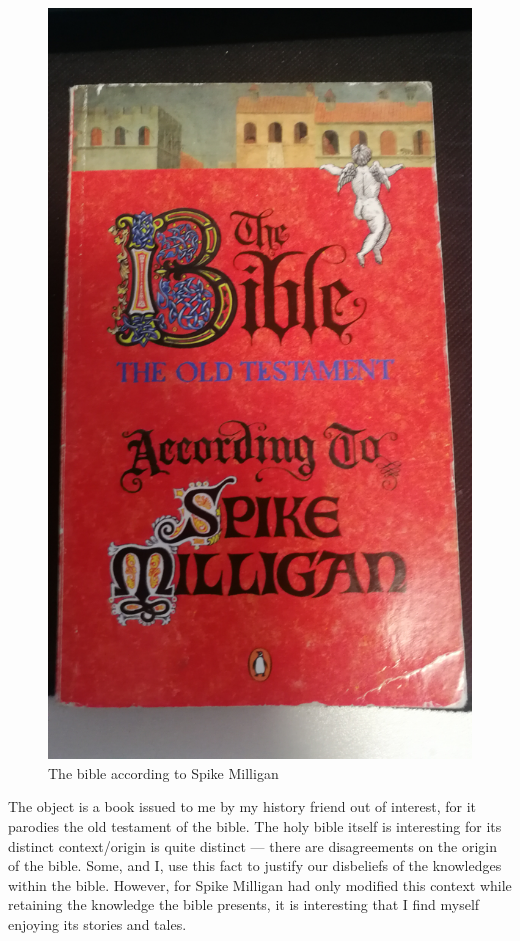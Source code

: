 \documentclass[a4paper,11pt]{article}
\begin{document}
\begin{figure}[h!]
 \centering
 \includegraphics[scale=0.05]{bible.jpg}
 \caption{The bible according to Spike Milligan}
 \label{fig:bible}
\end{figure}

The object is a book issued to me by my history friend out of interest, for it parodies the old testament of the bible. The holy bible itself is interesting for its distinct context/origin is quite distinct --- there are disagreements on the origin of the bible. Some, and I, use this fact to justify our disbeliefs of the knowledges within the bible. However, for Spike Milligan had only modified this context while retaining the knowledge the bible presents, it is interesting that I find myself enjoying its stories and tales.
\end{document}

